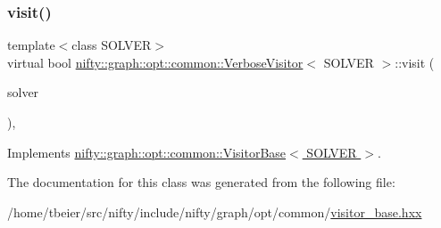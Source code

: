 \mbox{\label{classnifty_1_1graph_1_1opt_1_1common_1_1VerboseVisitor_afa21c42d9fa10fe8be09d55c4a51c49e}} 
\subsubsection{\texorpdfstring{visit()}{visit()}}
{\footnotesize\ttfamily template$<$class S\+O\+L\+V\+ER$>$ \\
virtual bool \hyperlink{classnifty_1_1graph_1_1opt_1_1common_1_1VerboseVisitor}{nifty\+::graph\+::opt\+::common\+::\+Verbose\+Visitor}$<$ S\+O\+L\+V\+ER $>$\+::visit (\begin{DoxyParamCaption}\item[{\hyperlink{classnifty_1_1graph_1_1opt_1_1common_1_1VisitorBase_a433d03139897d4aefe27315b2bbb3adc}{Solver\+Type} $\ast$}]{solver }\end{DoxyParamCaption})\hspace{0.3cm}{\ttfamily [inline]}, {\ttfamily [virtual]}}



Implements \hyperlink{classnifty_1_1graph_1_1opt_1_1common_1_1VisitorBase_aaeef625f11705918d3fdd05f2550a879}{nifty\+::graph\+::opt\+::common\+::\+Visitor\+Base$<$ S\+O\+L\+V\+E\+R $>$}.



The documentation for this class was generated from the following file\+:\begin{DoxyCompactItemize}
\item 
/home/tbeier/src/nifty/include/nifty/graph/opt/common/\hyperlink{visitor__base_8hxx}{visitor\+\_\+base.\+hxx}\end{DoxyCompactItemize}
